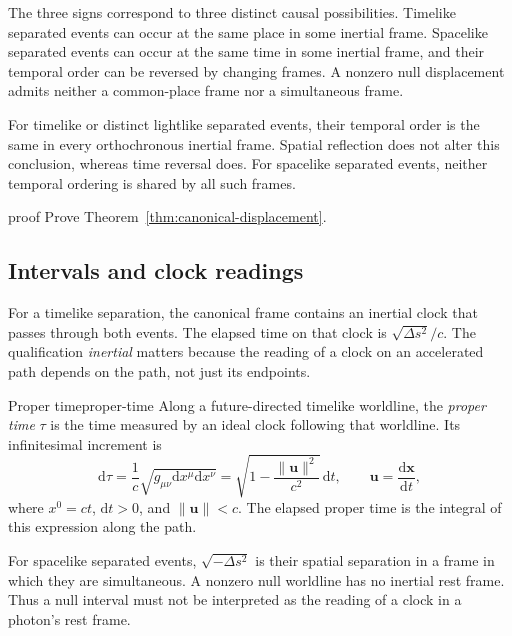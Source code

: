 \documentclass[11pt,a4paper]{article}
\newcommand{\vect}[1]{\bm{#1}}
\newcommand{\dd}{\mathrm{d}}
\begin{document}
The three signs correspond to three distinct causal possibilities. Timelike
separated events can occur at the same place in some inertial frame. Spacelike
separated events can occur at the same time in some inertial frame, and their
temporal order can be reversed by changing frames. A nonzero null displacement
admits neither a common-place frame nor a simultaneous frame.

\begin{precision}
For timelike or distinct lightlike separated events, their temporal order is
the same in every orthochronous inertial frame. Spatial reflection does not
alter this conclusion, whereas time reversal does. For spacelike separated
events, neither temporal ordering is shared by all such frames.
\end{precision}

\begin{studentwork}[height=8.0cm]{proof}
Prove Theorem~\ref{thm:canonical-displacement}.
\end{studentwork}

\subsection{Intervals and clock readings}

For a timelike separation, the canonical frame contains an inertial clock
that passes through both events. The elapsed time on that clock is
\(\sqrt{\Delta s^2}/c\). The qualification \emph{inertial} matters because
the reading of a clock on an accelerated path depends on the path, not just
its endpoints.

\begin{definition}{Proper time}{proper-time}
Along a future-directed timelike worldline, the \emph{proper time} \(\tau\)
is the time measured by an ideal clock following that worldline. Its
infinitesimal increment is
\[
  \dd\tau=\frac{1}{c}\sqrt{g_{\mu\nu}\dd x^\mu\dd x^\nu}
  =\sqrt{1-\frac{\lVert\vect u\rVert^2}{c^2}}\,\dd t,
  \qquad \vect u=\frac{\dd\vect x}{\dd t},
\]
where \(x^0=ct\), \(\dd t>0\), and \(\lVert\vect u\rVert<c\).
The elapsed proper time is the integral of this expression along the path.
\end{definition}

For spacelike separated events, \(\sqrt{-\Delta s^2}\) is their spatial
separation in a frame in which they are simultaneous. A nonzero null
worldline has no inertial rest frame. Thus a null interval must not be
interpreted as the reading of a clock in a photon's rest frame.
\end{document}
